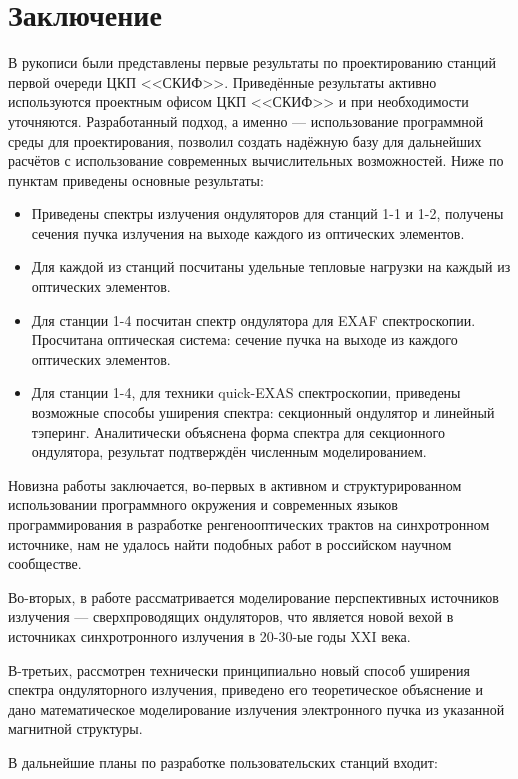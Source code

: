 \chapter{Заключение}

В рукописи были представлены первые результаты по проектированию станций первой очереди ЦКП <<СКИФ>>. Приведённые результаты активно используются проектным офисом ЦКП <<СКИФ>> и при необходимости уточняются. Разработанный подход, а именно --- использование программной среды для проектирования, позволил создать надёжную базу для дальнейших расчётов с использование современных вычислительных возможностей. Ниже по пунктам приведены основные результаты: 

\begin{itemize}
	\item Приведены спектры излучения ондуляторов для станций 1-1 и 1-2, получены сечения пучка излучения на выходе каждого из оптических элементов.
	\item Для каждой из станций посчитаны удельные тепловые нагрузки на каждый из оптических элементов.
	\item Для станции 1-4 посчитан спектр ондулятора для EXAF спектроскопии. Просчитана оптическая система: сечение пучка на выходе из каждого оптических элементов.
	\item Для станции 1-4, для техники quick-EXAS спектроскопии, приведены возможные способы уширения спектра: секционный ондулятор и линейный тэперинг. Аналитически объяснена форма спектра для секционного ондулятора, результат подтверждён численным моделированием.
\end{itemize}

Новизна работы заключается, во-первых в активном и структурированном использовании программного окружения и современных языков программирования в разработке ренгенооптических трактов на синхротронном источнике, нам не удалось найти подобных работ в российском научном сообществе. 

Во-вторых, в работе рассматривается моделирование перспективных источников излучения --- сверхпроводящих ондуляторов, что является новой вехой в источниках синхротронного излучения в 20-30-ые годы XXI века. 

В-третьих, рассмотрен технически принципиально новый способ уширения спектра ондуляторного излучения, приведено его теоретическое объяснение и дано математическое моделирование излучения электронного пучка из указанной магнитной структуры.

В дальнейшие планы по разработке пользовательских станций входит: 

